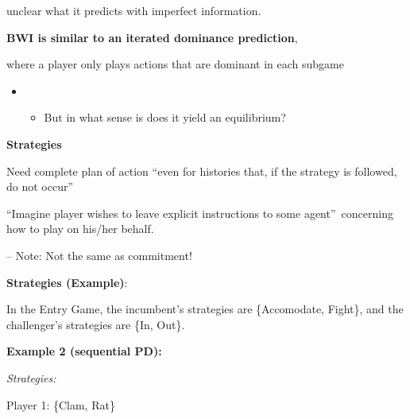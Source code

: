 unclear what it predicts with imperfect information.

\bigskip




\textbf{BWI is similar to an iterated dominance prediction},

where a player only plays actions that are dominant in each subgame

\begin{itemize}
\item
\begin{itemize}
\item But in what sense is does it yield an equilibrium?
\end{itemize}
\end{itemize}



\textbf{Strategies}

Need complete plan of action \textquotedblleft even for histories that, if
the strategy is followed, do not occur\textquotedblright


\textquotedblleft Imagine player wishes to leave explicit instructions to
some agent\textquotedblright\ concerning how to play on his/her behalf.

-- Note: Not the same as commitment!



\textbf{Strategies (Example)}:

In the Entry Game, the incumbent's strategies are \{Accomodate, Fight\}, and
the challenger's strategies are \{In, Out\}.\bigskip



\textbf{Example 2 (sequential PD): }


\textit{Strategies:}

Player 1: \{Clam, Rat\}

